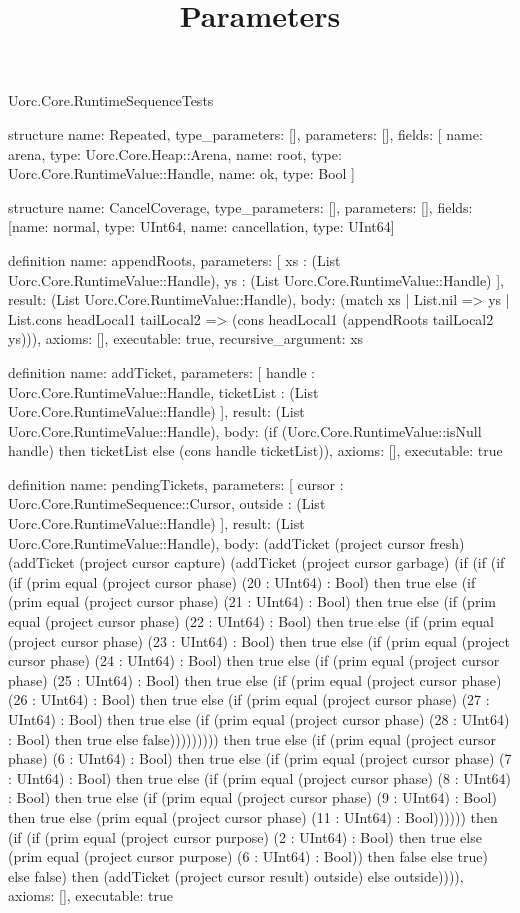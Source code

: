 \begin{lexlean}{Uorc.Core.RuntimeSequenceTests}
\title{Parameters}
\begin{semanticmodule}
structure{
  name: Repeated,
  type_parameters: [],
  parameters: [],
  fields: [
    {name: arena, type: Uorc.Core.Heap::Arena},
    {name: root, type: Uorc.Core.RuntimeValue::Handle},
    {name: ok, type: Bool}
  ]
}

structure{
  name: CancelCoverage,
  type_parameters: [],
  parameters: [],
  fields: [{name: normal, type: UInt64}, {name: cancellation, type: UInt64}]
}

definition{
  name: appendRoots,
  parameters: [
    xs : (List Uorc.Core.RuntimeValue::Handle),
    ys : (List Uorc.Core.RuntimeValue::Handle)
  ],
  result: (List Uorc.Core.RuntimeValue::Handle),
  body: (match xs
    | List.nil => ys
    | List.cons headLocal1 tailLocal2 => (cons headLocal1 (appendRoots tailLocal2 ys))),
  axioms: [],
  executable: true,
  recursive_argument: xs
}

definition{
  name: addTicket,
  parameters: [
    handle : Uorc.Core.RuntimeValue::Handle,
    ticketList : (List Uorc.Core.RuntimeValue::Handle)
  ],
  result: (List Uorc.Core.RuntimeValue::Handle),
  body: (if (Uorc.Core.RuntimeValue::isNull handle) then ticketList else (cons handle ticketList)),
  axioms: [],
  executable: true
}

definition{
  name: pendingTickets,
  parameters: [
    cursor : Uorc.Core.RuntimeSequence::Cursor,
    outside : (List Uorc.Core.RuntimeValue::Handle)
  ],
  result: (List Uorc.Core.RuntimeValue::Handle),
  body: (addTicket (project cursor fresh) (addTicket (project cursor capture) (addTicket (project cursor garbage) (if (if (if (if (prim equal (project cursor phase) (20 : UInt64) : Bool) then true else (if (prim equal (project cursor phase) (21 : UInt64) : Bool) then true else (if (prim equal (project cursor phase) (22 : UInt64) : Bool) then true else (if (prim equal (project cursor phase) (23 : UInt64) : Bool) then true else (if (prim equal (project cursor phase) (24 : UInt64) : Bool) then true else (if (prim equal (project cursor phase) (25 : UInt64) : Bool) then true else (if (prim equal (project cursor phase) (26 : UInt64) : Bool) then true else (if (prim equal (project cursor phase) (27 : UInt64) : Bool) then true else (if (prim equal (project cursor phase) (28 : UInt64) : Bool) then true else false))))))))) then true else (if (prim equal (project cursor phase) (6 : UInt64) : Bool) then true else (if (prim equal (project cursor phase) (7 : UInt64) : Bool) then true else (if (prim equal (project cursor phase) (8 : UInt64) : Bool) then true else (if (prim equal (project cursor phase) (9 : UInt64) : Bool) then true else (prim equal (project cursor phase) (11 : UInt64) : Bool)))))) then (if (if (prim equal (project cursor purpose) (2 : UInt64) : Bool) then true else (prim equal (project cursor purpose) (6 : UInt64) : Bool)) then false else true) else false) then (addTicket (project cursor result) outside) else outside)))),
  axioms: [],
  executable: true
}


\end{semanticmodule}
\end{lexlean}
